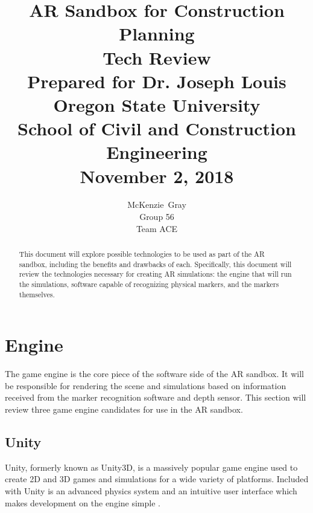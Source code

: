 \documentclass[letterpaper, 10pt, onecolumn, draftclsnofoot]{IEEEtran}
\begin{document}
\title{
    \Large{AR Sandbox for Construction Planning} \\
    \small{Tech Review} \\
    \vspace{15pt}
    \large{Prepared for Dr. Joseph Louis \\
    Oregon State University \\
    School of Civil and Construction Engineering \\
    November 2, 2018}
    }

\author{McKenzie~Gray\\Group 56\\Team ACE}
        
\maketitle

\vspace*{\fill}

\begin{abstract}
This document will explore possible technologies to be used as part of the AR sandbox, including the benefits and drawbacks of each. Specifically, this document will review the technologies necessary for creating AR simulations: the engine that will run the simulations, software capable of recognizing physical markers, and the markers themselves.
\end{abstract}
\newpage

\tableofcontents
\newpage

\section{Engine} \label{engine}
The game engine is the core piece of the software side of the AR sandbox. It will be responsible for rendering the scene and simulations based on information received from the marker recognition software and depth sensor. This section will review three game engine candidates for use in the AR sandbox.

\subsection{Unity}
Unity, formerly known as Unity3D, is a massively popular game engine used to create 2D and 3D games and simulations for a wide variety of platforms. Included with Unity is an advanced physics system and an intuitive user interface which makes development on the engine simple \cite{unity}.
\end{document}
